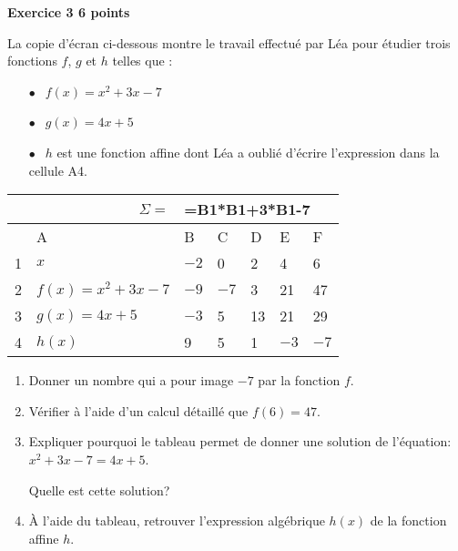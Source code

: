\textbf{Exercice 3 \hfill 6 points}

\medskip
 
La copie d'écran ci-dessous montre le travail effectué par Léa pour étudier trois fonctions $f$, $g$ et $h$ telles 
que :

\setlength\parindent{5mm}
\begin{itemize}
\item[$\bullet~~$] $f(x) =x^2+ 3x - 7$ 
\item[$\bullet~~$] $g(x) = 4x + 5$
\item[$\bullet~~$] $h$ est une fonction affine dont Léa a oublié d'écrire l'expression dans la cellule A4. 
\end{itemize}
\setlength\parindent{0mm}

\begin{center}
\begin{tabularx}{\linewidth}{|c|m{3cm}|*{5}{X|}}\hline
\multicolumn{2}{|r|}{$\Sigma =$}&\multicolumn{5}{l|}{=B1*B1+3*B1-7}\\ \hline 
	&A	&B	&C	&D	&E	&F\\ \hline
1	&$x$&$- 2$&0&2&4&6\\ \hline
2	&$f(x) = x^2 + 3x - 7$&$- 9$&$- 7$&3&21&47 \\ \hline
3	&$g(x) = 4x + 5$&$- 3$&5&13&21&29\\ \hline
4	&$h(x)$	&9	&5	&1	&$- 3$	&$- 7$\\ \hline
\end{tabularx}
\end{center}

\begin{enumerate}
\item Donner un nombre qui a pour image $- 7$ par la fonction $f$. 
\item Vérifier à l'aide d'un calcul détaillé que $f(6) = 47$. 
\item Expliquer pourquoi le tableau permet de donner une solution de l'équation: $x^2 + 3x - 7 = 4x + 5$.
 
Quelle est cette solution? 
\item À l'aide du tableau, retrouver l'expression algébrique $h(x)$ de la fonction affine $h$.
\end{enumerate}

\bigskip

